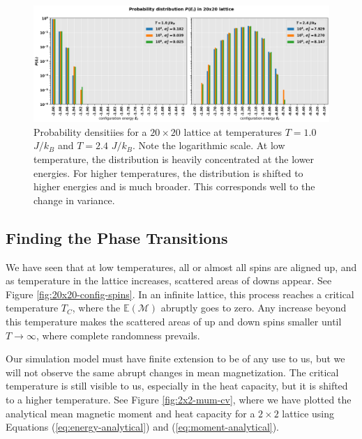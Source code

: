 \documentclass[]{article}
\begin{document}
\begin{figure}[!h]
	\centering
	\includegraphics[width=1\linewidth]{./figs/20x20-prob-dist.png}
	\caption{Probability densitiies for a $20 \times 20$ lattice at temperatures $T = 1.0$ $J/k_B$ and $T = 2.4$ $J/k_B$. Note the logarithmic scale. At low temperature, the distribution is heavily concentrated at the lower energies. For higher temperatures, the distribution is shifted to higher energies and is much broader. This corresponds well to the change in variance.}
	\label{fig:20x20-prob-dist}
\end{figure}

\subsection{Finding the Phase Transitions} \label{sec:equilibration}
We have seen that at low temperatures, all or almost all spins are aligned up, and as temperature in the lattice increases, scattered areas of downs appear. See Figure \ref{fig:20x20-config-spins}. In an infinite lattice, this process reaches a critical temperature $T_C$, where the $\mathbb{E}(\mathcal{M})$ abruptly goes to zero. Any increase beyond this temperature makes the scattered areas of up and down spins smaller until $T \rightarrow \infty$, where complete randomness prevails.

Our simulation model must have finite extension to be of any use to us, but we will not observe the same abrupt changes in mean magnetization. The critical temperature is still visible to us, especially in the heat capacity, but it is shifted to a higher temperature. See Figure \ref{fig:2x2-mum-cv}, where we have plotted the analytical mean magnetic moment and heat capacity for a $2 \times 2$ lattice using Equations (\ref{eq:energy-analytical}) and (\ref{eq:moment-analytical}). 
\end{document}
